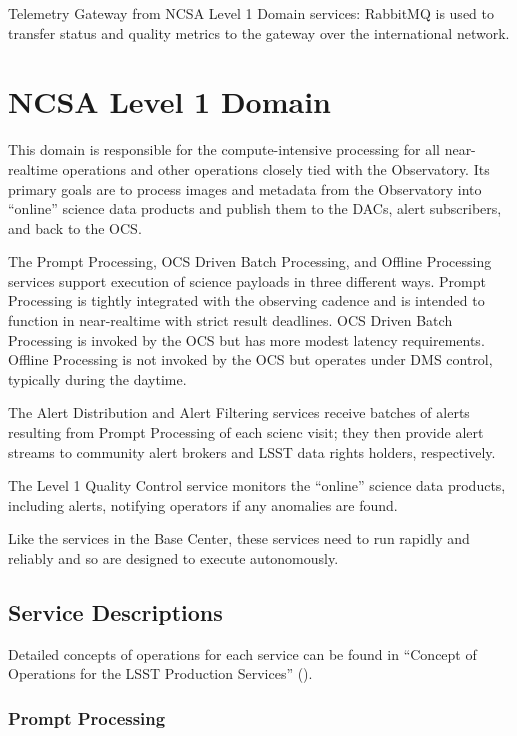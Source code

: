 \documentclass[DM,toc]{lsstdoc}
\begin{document}
Telemetry Gateway from NCSA Level 1 Domain services: RabbitMQ is
used to transfer status and quality metrics to the gateway over the
international network.

\section{NCSA Level 1 Domain}\label{ncsa-level-1-domain}

This domain is responsible for the compute-intensive processing for all
near-realtime operations and other operations closely tied with the
Observatory. Its primary goals are to process images and metadata from
the Observatory into ``online'' science data products and publish them
to the DACs, alert subscribers, and back to the OCS.

The Prompt Processing, OCS Driven Batch Processing, and Offline
Processing services support execution of science payloads in three
different ways. Prompt Processing is tightly integrated with the
observing cadence and is intended to function in near-realtime with
strict result deadlines. OCS Driven Batch Processing is invoked by the
OCS but has more modest latency requirements. Offline Processing is not
invoked by the OCS but operates under DMS control, typically during the
daytime.

The Alert Distribution and Alert Filtering services receive batches of
alerts resulting from Prompt Processing of each scienc visit; they then
provide alert streams to community alert brokers and LSST data rights
holders, respectively.

The Level 1 Quality Control service monitors the ``online'' science data
products, including alerts, notifying operators if any anomalies are
found.

Like the services in the Base Center, these services need to run
rapidly and reliably and so are designed to execute autonomously.

\subsection{Service Descriptions}\label{ncsa-l1-service-descriptions}

Detailed concepts of operations for each service can be found in
``Concept of Operations for the LSST Production Services'' ().

\subsubsection{Prompt Processing}\label{prompt-processing}
\end{document}
